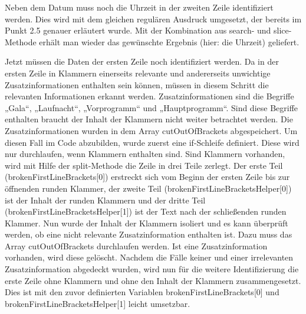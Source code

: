 {Neben dem Datum muss noch die Uhrzeit in der zweiten Zeile identifiziert werden. Dies wird mit dem gleichen regulären Ausdruck umgesetzt, der bereits im Punkt 2.5 genauer erläutert wurde. Mit der Kombination aus search- und slice-Methode erhält man wieder das gewünschte Ergebnis (hier: die Uhrzeit) geliefert. 

Jetzt müssen die Daten der ersten Zeile noch identifiziert werden. 
Da in der ersten Zeile in Klammern einerseits relevante und andererseits unwichtige Zusatzinformationen enthalten sein können, müssen in diesem Schritt die relevanten Informationen erkannt werden. Zusatzinformationen sind die Begriffe „Gala“, „Laufnacht“, „Vorprogramm“ und „Hauptprogramm“.  Sind diese Begriffe enthalten braucht der Inhalt der Klammern nicht weiter betrachtet werden. Die Zusatzinformationen wurden in dem Array cutOutOfBrackets abgespeichert. Um diesen Fall im Code abzubilden, wurde zuerst eine if-Schleife definiert. Diese wird nur durchlaufen, wenn Klammern enthalten sind. Sind Klammern vorhanden, wird mit Hilfe der split-Methode die Zeile in drei Teile zerlegt. Der erste Teil (brokenFirstLineBrackets[0]) erstreckt sich vom Beginn der ersten Zeile bis zur öffnenden runden Klammer, der zweite Teil (brokenFirstLineBracketsHelper[0]) ist der Inhalt der runden Klammern und der dritte Teil (brokenFirstLineBracketsHelper[1]) ist der Text nach der schließenden runden Klammer. Nun wurde der Inhalt der Klammern isoliert und es kann überprüft werden, ob eine nicht relevante Zusatzinformation enthalten ist. Dazu muss das Array cutOutOfBrackets durchlaufen werden. Ist eine Zusatzinformation vorhanden, wird diese gelöscht. Nachdem die Fälle keiner und einer irrelevanten Zusatzinformation abgedeckt wurden, wird nun für die weitere Identifizierung die erste Zeile ohne Klammern und ohne den Inhalt der Klammern zusammengesetzt. Dies ist mit den zuvor definierten Variablen brokenFirstLineBrackets[0] und brokenFirstLineBracketsHelper[1] leicht umsetzbar.

}
